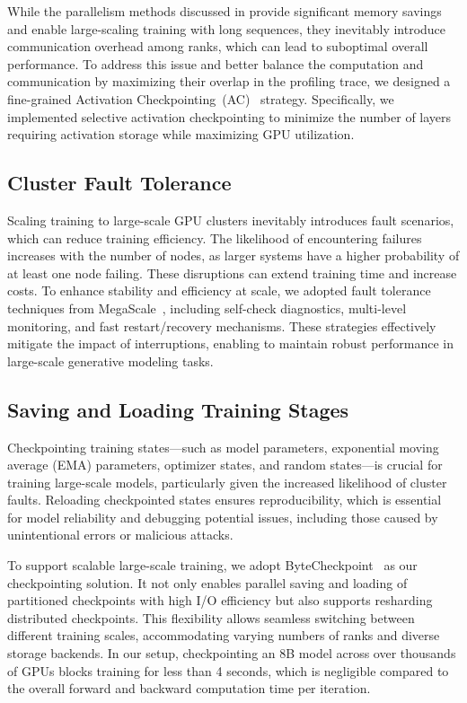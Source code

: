 While the parallelism methods discussed in  provide significant memory savings and enable large-scaling training with long sequences, they inevitably introduce communication overhead among ranks, which can lead to suboptimal overall performance. To address this issue and better balance the computation and communication by maximizing their overlap in the profiling trace, we designed a fine-grained Activation Checkpointing~(AC)~\citep{chen2016training} strategy. Specifically, we implemented selective activation checkpointing to minimize the number of layers requiring activation storage while maximizing GPU utilization.

\subsection{Cluster Fault Tolerance}\label{sec:infra-robust-training}

Scaling \ours training to large-scale GPU clusters inevitably introduces fault scenarios, which can reduce training efficiency. The likelihood of encountering failures increases with the number of nodes, as larger systems have a higher probability of at least one node failing. These disruptions can extend training time and increase costs. To enhance stability and efficiency at scale, we adopted fault tolerance techniques from MegaScale~\citep{jiang2024megascale}, including self-check diagnostics, multi-level monitoring, and fast restart/recovery mechanisms. These strategies effectively mitigate the impact of interruptions, enabling \ours to maintain robust performance in large-scale generative modeling tasks.

 
\subsection{Saving and Loading Training Stages}\label{sec:infra-byted-ckpt}
Checkpointing training states—such as model parameters, exponential moving average (EMA) parameters, optimizer states, and random states—is crucial for training large-scale models, particularly given the increased likelihood of cluster faults. Reloading checkpointed states ensures reproducibility, which is essential for model reliability and debugging potential issues, including those caused by unintentional errors or malicious attacks.

To support scalable large-scale training, we adopt ByteCheckpoint~\citep{wan2024bytecheckpoint} as our checkpointing solution. It not only enables parallel saving and loading of partitioned checkpoints with high I/O efficiency but also supports resharding distributed checkpoints. This flexibility allows seamless switching between different training scales, accommodating varying numbers of ranks and diverse storage backends. 
In our setup, checkpointing an 8B model across over thousands of GPUs blocks training for less than 4 seconds, which is negligible compared to the overall forward and backward computation time per iteration.

